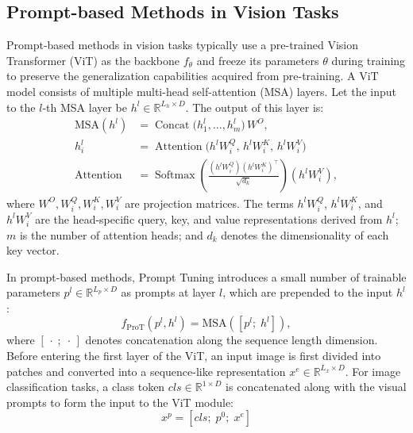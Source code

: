 ﻿\documentclass[letterpaper,journal]{IEEEtran}
\begin{document}
\subsection{Prompt-based Methods in Vision Tasks}
Prompt-based methods in vision tasks typically use a pre-trained Vision Transformer (ViT) as the backbone $f_\theta$ and freeze its parameters $\theta$ during training to preserve the generalization capabilities acquired from pre-training. A ViT model consists of multiple multi-head self-attention (MSA) layers. Let the input to the $l$-th MSA layer be $h^l\in\mathbb{R}^{L_h\times D}$. The output of this layer is:
%
\begin{equation}
\begin{aligned}
\mathrm{MSA}(h^l) &= \operatorname{Concat}\big(h_1^l,\ldots,h_m^l\big)\,W^O,\\
h_i^l &= \operatorname{Attention}\!\big(h^lW_i^Q,\,h^lW_i^K,\,h^lW_i^V\big)\\
\operatorname{Attention} &=\operatorname{Softmax}\!\left(\frac{(h^lW_i^Q)(h^lW_i^K)^{\top}}{\sqrt{d_k}}\right)(h^lW_i^V),
\end{aligned}
\end{equation} where $W^O, W_i^Q, W_i^K, W_i^V$ are projection matrices. The terms $h^l W_i^Q$, $h^l W_i^K$, and $h^l W_i^V$ are the head-specific query, key, and value representations derived from $h^l$; $m$ is the number of attention heads; and $d_k$ denotes the dimensionality of each key vector.

In prompt-based methods, Prompt Tuning introduces a small number of trainable parameters $p^l\in\mathbb{R}^{L_p\times D}$ as prompts at layer $l$, which are prepended to the input $h^l$:
\begin{equation}
f_{\mathrm{ProT}}(p^l,h^l)=\mathrm{MSA}([p^l;\;h^l]),
\end{equation} where $[\,\cdot\;;\;\cdot\,]$ denotes concatenation along the sequence length dimension. Before entering the first layer of the ViT, an input image is first divided into patches and converted into a sequence-like representation $x^e\in\mathbb{R}^{L_x\times D}$. For image classification tasks, a class token $cls\in\mathbb{R}^{1\times D}$ is concatenated along with the visual prompts to form the input to the ViT module:
\begin{equation}
x^p=[cls;\;p^0;\;x^e]
\end{equation}
\end{document}
